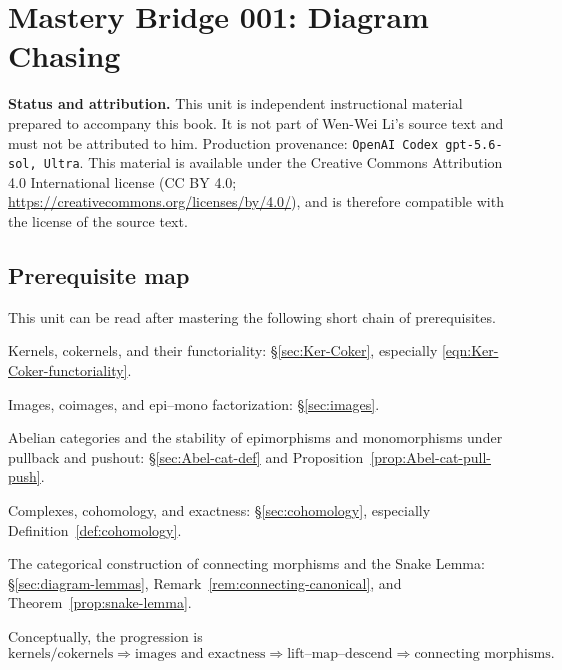 
\section*{Mastery Bridge 001: Diagram Chasing}
\hypertarget{o014.mastery.diagram-chasing.001}{ }
\label{mastery:diagram-chasing-001}

\noindent\textbf{Status and attribution.}
This unit is independent instructional material prepared to accompany this
book. It is not part of Wen-Wei Li's source text and must not be attributed to
him. Production provenance:
\texttt{OpenAI Codex gpt-5.6-sol, Ultra}. This material is available under the
Creative Commons Attribution 4.0 International license
(CC BY 4.0; \url{https://creativecommons.org/licenses/by/4.0/}), and is
therefore compatible with the license of the source text.

\subsection*{Prerequisite map}

This unit can be read after mastering the following short chain of
prerequisites.
\begin{compactitem}
	\item Kernels, cokernels, and their functoriality:
	\S\ref{sec:Ker-Coker}, especially
	\eqref{eqn:Ker-Coker-functoriality}.
	\item Images, coimages, and epi--mono factorization:
	\S\ref{sec:images}.
	\item Abelian categories and the stability of epimorphisms and
	monomorphisms under pullback and pushout:
	\S\ref{sec:Abel-cat-def} and
	Proposition~\ref{prop:Abel-cat-pull-push}.
	\item Complexes, cohomology, and exactness:
	\S\ref{sec:cohomology}, especially
	Definition~\ref{def:cohomology}.
	\item The categorical construction of connecting morphisms and the Snake
	Lemma:
	\S\ref{sec:diagram-lemmas}, Remark~\ref{rem:connecting-canonical}, and
	Theorem~\ref{prop:snake-lemma}.
\end{compactitem}
Conceptually, the progression is
\[
	\text{kernels/cokernels}
	\Longrightarrow \text{images and exactness}
	\Longrightarrow \text{lift--map--descend}
	\Longrightarrow \text{connecting morphisms}.
\]


